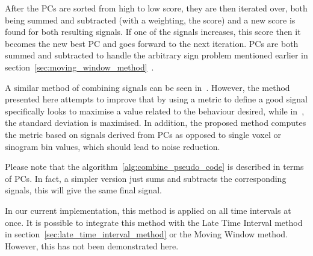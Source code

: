             After the \glspl{PC} are sorted from high to low score, they are then iterated over, both being summed and subtracted (with a weighting, the score) and a new score is found for both resulting signals. If one of the signals increases, this score then it becomes the new best \gls{PC} and goes forward to the next iteration. \glspl{PC} are both summed and subtracted to handle the arbitrary sign problem mentioned earlier in section~\ref{sec:moving_window_method}~\parencite{Bertolli2017}.
            
            A similar method of combining signals can be seen in~\parencite{Kesner2010AMethods}. However, the method presented here attempts to improve that by using a metric to define a good signal specifically looks to maximise a value related to the behaviour desired, while in~\parencite{Kesner2010AMethods}, the standard deviation is maximised. In addition, the proposed method computes the metric based on signals derived from \glspl{PC} as opposed to single voxel or sinogram bin values, which should lead to noise reduction.
            
            Please note that the algorithm~\ref{alg:combine_pseudo_code} is described in terms of \glspl{PC}. In fact, a simpler version just sums and subtracts the corresponding signals, this will give the same final signal. 
        
            In our current implementation, this method is applied on all time intervals at once. It is possible to integrate this method with the Late Time Interval method in section~\ref{sec:late_time_interval_method} or the Moving Window method. However, this has not been demonstrated here.
            
